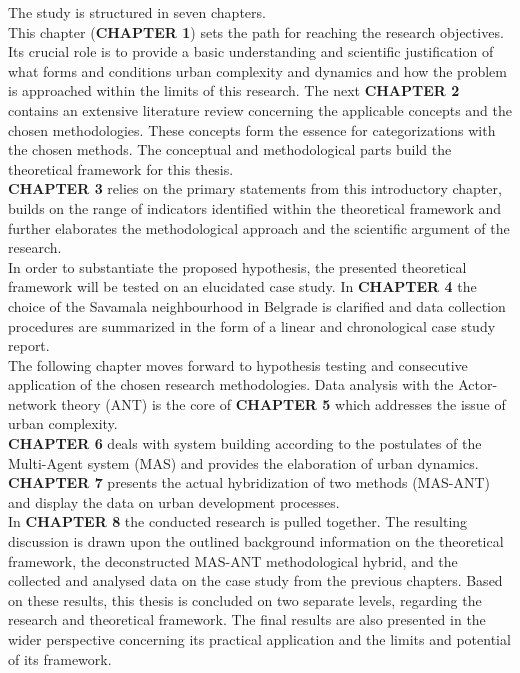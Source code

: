 \documentclass[11pt]{report}
\begin{document}
{{The study is structured in seven chapters.
\\
This chapter (\textbf{CHAPTER 1}) sets the path for reaching the research objectives. Its crucial role is to provide a basic understanding and scientific justification of what forms and conditions urban complexity and dynamics and how the problem is approached within the limits of this research. The next \textbf{CHAPTER 2} contains an extensive literature review concerning the applicable concepts and the chosen methodologies. These concepts form the essence for categorizations with the chosen methods.
The conceptual and methodological parts build the theoretical framework for this thesis. 
\\
\textbf{CHAPTER 3} relies on the primary statements from this introductory chapter, builds on the range of indicators identified within the theoretical framework and further elaborates the methodological approach and the scientific argument of the research.
\\
In order to substantiate the proposed hypothesis, the presented theoretical  framework  will  be tested on an elucidated case study. In \textbf{CHAPTER 4} the choice of the Savamala neighbourhood in Belgrade is clarified and data collection procedures are summarized in the form of a linear and chronological case study report.
\\
The following chapter moves forward to hypothesis testing and consecutive application of the chosen research methodologies. Data analysis with the Actor-network theory (ANT) is the core of \textbf{CHAPTER 5} which addresses the issue of urban complexity.
\\
\textbf{CHAPTER 6} deals with system building according to the postulates of the Multi-Agent system (MAS) and provides the elaboration of urban dynamics.
\\
\textbf{CHAPTER 7} presents the actual hybridization of two methods (MAS-ANT) and display the data on urban development processes.
\\
In \textbf{CHAPTER 8} the conducted research is pulled together. The resulting discussion is drawn upon the outlined background information on the theoretical framework, the deconstructed MAS-ANT methodological hybrid, and the collected and analysed data on the case study from the previous chapters. Based on these results, this thesis is concluded on two separate levels, regarding the research and theoretical framework. The final results are also presented in the wider perspective concerning its practical application and the limits and potential of its framework.

}}
\end{document}
